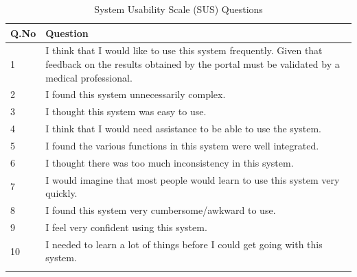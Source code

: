 \begin{longtable}{| p{} | p{} |} 
    \hline
    		\textbf{Q.No}    &\textbf{Question} 
\\\hline
            1   &I think that I would like to use this system frequently. Given that feedback on the results obtained by the portal must be validated by a medical professional. 
\\\hline
2   &I found this system unnecessarily complex. 
\\\hline
3   &I thought this system was easy to use. 
\\\hline
4   &I think that I would need assistance to be able to use the system. 
\\\hline
5   &I found the various functions in this system were well integrated. 
\\\hline
6   &I thought there was too much inconsistency in this system. 
\\\hline
7   &I would imagine that most people would learn to use this system very quickly.
\\\hline
8   &I found this system very cumbersome/awkward to use.
\\\hline
9   &I feel very confident using this system.
\\\hline
10  &I needed to learn a lot of things before I could get going with this system.
\\\hline

\caption{System Usability Scale (SUS) Questions} \label{susQ}
        \end{longtable}
\vspace{-1em}
